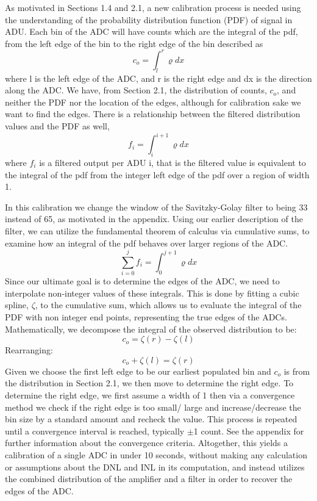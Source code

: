\documentclass[11pt, letterpaper]{article}
\begin{document}
As motivated in Sections 1.4 and 2.1, a new calibration process is needed using the understanding of the probability distribution function (PDF) of signal in ADU. 
Each bin of the ADC will have counts which are the integral of the pdf, from the left edge of the bin to the right edge of the bin described as
\[ c_o =  \int_{l}^{r} \varrho dx\]
where l is the left edge of the ADC, and r is the right edge and dx is the direction along the ADC. 
We have, from Section 2.1, the distribution of counts, $c_{o}$, and neither the PDF nor the location of the edges, although for calibration sake we want to find the edges. 
There is a relationship between the filtered distribution values and the PDF as well,
\[ f_i =  \int_{i}^{i+1} \varrho dx\]
where $f_{i}$ is a filtered output per ADU i, that is the filtered value is equivalent to the integral of the pdf from the integer left edge of the pdf over a region of width 1. 
\indent 


In this calibration we change the window of the Savitzky-Golay filter to being 33 instead of 65, as motivated in the appendix. 
Using our earlier description of the filter, we can utilize the fundamental theorem of calculus via cumulative sums, to examine how an integral of the pdf behaves over larger regions of the ADC. 
\[ \sum_{i=0}^{j} f_i= \int_{0}^{j+1} \varrho dx \]
Since our ultimate goal is to determine the edges of the ADC, we need to interpolate non-integer values of these integrals. 
This is done by fitting a cubic spline, $ \zeta$, to the cumulative sum, which allows us to evaluate the integral of the PDF with non integer end points, representing the true edges of the ADCs. 
Mathematically, we decompose the integral of the observed distribution to be:
\[c_o = \zeta(r) - \zeta(l) \]
Rearranging: 
\[c_o + \zeta(l) = \zeta(r) \]
Given we choose the first left edge to be our earliest populated bin and $c_{o}$ is from the distribution in Section 2.1, we then move to determine the right edge. 
To determine the right edge, we first assume a width of 1 then via a convergence method we check if the right edge is too small/ large and increase/decrease the bin size by a standard amount and recheck the value. 
This process is repeated until a convergence interval is reached, typically $\pm$1 count. 
See the appendix for further information about the convergence criteria. 
Altogether, this yields a calibration of a single ADC in under 10 seconds, without making any calculation or assumptions about the DNL and INL in its computation, and instead utilizes the combined distribution of the amplifier and a filter in order to recover the edges of the ADC.  
\end{document}
